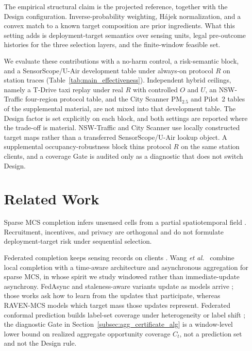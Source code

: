 \documentclass[letterpaper,journal]{IEEEtran}
\begin{document}
The empirical structural claim is the projected reference, together with the
Design configuration.  Inverse-probability weighting, H\'ajek normalization, and
a convex match to a known target composition are prior ingredients.  What this
setting adds is deployment-target semantics over sensing units, legal
pre-outcome histories for the three selection layers, and the finite-window
feasible set.

We evaluate these contributions with a no-harm control, a risk-semantic block,
and a SensorScope/U-Air development table under always-on protocol $R$ on station
traces (Table~\ref{tab:main_effectiveness}).  Independent hybrid ceilings, namely
a T-Drive taxi replay under real $R$ with controlled $O$ and $U$, an NSW-Traffic
four-region protocol table, and the City Scanner {PM}$_{2.5}$ and Pilot~2 tables
of the supplemental material, are not mixed into that development table.  The
Design factor is set explicitly on each block, and both settings are reported
where the trade-off is material.  NSW-Traffic and City Scanner use locally
constructed target maps rather than a transferred SensorScope/U-Air lookup
object.  A supplemental occupancy-robustness block thins protocol $R$ on the same
station clients, and a coverage Gate is audited only as a diagnostic that does not
switch Design.


\section{Related Work}
\label{sec:related_work}

Sparse MCS completion infers unsensed cells from a partial spatiotemporal
field
\cite{ganti2011mobile,guo2015mobile,ma2014opportunities,wang2023spatiotemporal,wang2023outlier,wang2023transformer,wang2024fewshot,li2024robust,wang2025evolutionary,xu2025rethinking,liu2026pyramid,zhang2026mapt,liu2026pricing}.
Recruitment, incentives, and privacy
\cite{liu2026multidimensional,zhang2025incentive,lu2025piece,zhang2026locally}
are orthogonal and do not formulate deployment-target risk under sequential
selection.

Federated completion keeps sensing records on clients
\cite{mcmahan2017communication,yang2019federated,kairouz2021advances,li2020federated}.
Wang \emph{et al.}~\cite{wang2026federated} combine local completion with a
time-aware architecture and asynchronous aggregation for sparse MCS, in whose
spirit we study windowed rather than immediate-update asynchrony.
FedAsync and staleness-aware variants update as models arrive
\cite{xie2019asynchronous,liu2023adaptive,sun2024staleness,islam2025seafl,li2026stdfl};
those works ask how to learn from the updates that participate, whereas
RAVEN-MCS models which target mass those updates represent.  Federated conformal
prediction builds label-set coverage under heterogeneity or label shift
\cite{lu2023federated,plassier2023conformal}; the diagnostic Gate in
Section~\ref{subsec:agg_certificate_alg} is a window-level lower bound on
realized aggregate opportunity coverage $C_t$, not a prediction set and not the
Design rule.
\end{document}
